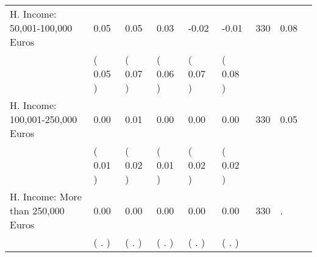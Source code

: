 \begin{tabular}{L{6.2cm} C{1.8cm} C{1.8cm} C{1.8cm} C{1.8cm} C{1.8cm} C{1.8cm} C{0.3cm} C{0.3cm}}
H. Income: 50,001-100,000 Euros &      0.05 &      0.05 &      0.03 &     -0.02 &     -0.01  & 330 &       0.08 \\ 
 & (     0.05 ) & (     0.07 ) & (     0.06 ) & (     0.07 ) & (     0.08 )  & \\
H. Income: 100,001-250,000 Euros &      0.00 &      0.01 &      0.00 &      0.00 &      0.00  & 330 &       0.05 \\ 
 & (     0.01 ) & (     0.02 ) & (     0.01 ) & (     0.02 ) & (     0.02 )  & \\
H. Income: More than 250,000 Euros &      0.00 &      0.00 &      0.00 &      0.00 &      0.00  & 330 &          . \\ 
 & (        . ) & (        . ) & (        . ) & (        . ) & (        . )  & \\
\bottomrule
\end{tabular}
